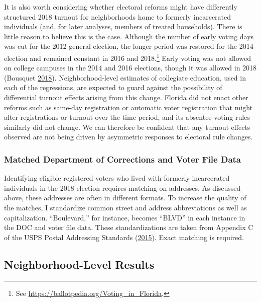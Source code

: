 \documentclass[
  12pt,
]{article}
\begin{document}
It is also worth considering whether electoral reforms might have differently structured 2018 turnout for neighborhoods home to formerly incarcerated individuals (and, for later analyses, members of treated households). There is little reason to believe this is the case. Although the number of early voting days was cut for the 2012 general election, the longer period was restored for the 2014 election and remained constant in 2016 and 2018.\footnote{See \url{https://ballotpedia.org/Voting_in_Florida}.} Early voting was not allowed on college campuses in the 2014 and 2016 elections, though it was allowed in 2018 (Bousquet \protect\hyperlink{ref-Bousquet2018a}{2018}). Neighborhood-level estimates of collegiate education, used in each of the regressions, are expected to guard against the possibility of differential turnout effects arising from this change. Florida did not enact other reforms such as same-day registration or automatic voter registration that might alter registrations or turnout over the time period, and its absentee voting rules similarly did not change. We can therefore be confident that any turnout effects observed are not being driven by asymmetric responses to electoral rule changes.

\hypertarget{matched-department-of-corrections-and-voter-file-data}{%
\subsubsection*{Matched Department of Corrections and Voter File Data}\label{matched-department-of-corrections-and-voter-file-data}}

Identifying eligible registered voters who lived with formerly incarcerated individuals in the 2018 election requires matching on addresses. As discussed above, these addresses are often in different formats. To increase the quality of the matches, I standardize common street and address abbreviations as well as capitalization. ``Boulevard,'' for instance, becomes ``BLVD'' in each instance in the DOC and voter file data. These standardizations are taken from Appendix C of the USPS Postal Addressing Standards (\protect\hyperlink{ref-USPS2015}{2015}). Exact matching is required.

\hypertarget{neighborhood-level-results}{%
\subsection*{Neighborhood-Level Results}\label{neighborhood-level-results}}
\end{document}
